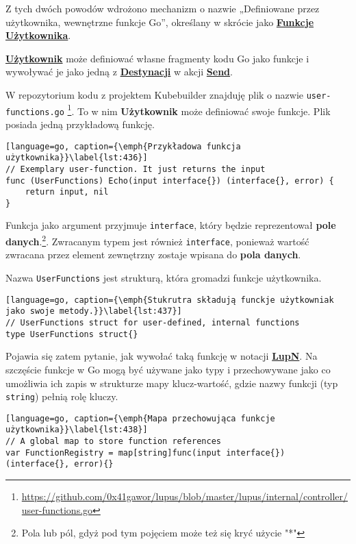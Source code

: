 Z tych dwóch powodów wdrożono mechanizm o nazwie „Definiowane przez użytkownika, wewnętrzne funkcje Go”, określany w skrócie jako \hyperlink{def:funkcje-uzytkownika}{\textbf{Funkcje Użytkownika}}.

\hyperlink{def:uzytkownik}{\textbf{Użytkownik}} może definiować własne fragmenty kodu Go jako funkcje i wywoływać je jako jedną z \hyperlink{def:destynacja}{\textbf{Destynacji}} w akcji \hyperlink{def:akcja}{\textbf{Send}}.

W repozytorium kodu z projektem Kubebuilder znajduję plik o nazwie \texttt{user-functions.go} \footnote{\url{https://github.com/0x41gawor/lupus/blob/master/lupus/internal/controller/user-functions.go}}. To w nim \textbf{Użytkownik} może definiować swoje funkcje. Plik posiada jedną przykładową funkcję.

\begin{lstlisting}[language=go, caption={\emph{Przykładowa funkcja użytkownika}}\label{lst:436}]
// Exemplary user-function. It just returns the input
func (UserFunctions) Echo(input interface{}) (interface{}, error) {
	return input, nil
}
\end{lstlisting}

Funkcja jako argument przyjmuje \texttt{interface{}}, który będzie reprezentował \textbf{pole danych}.\footnote{Pola lub pól, gdyż pod tym pojęciem może też się kryć użycie "*"}. Zwracanym typem jest również \texttt{interface{}}, ponieważ wartość zwracana przez element zewnętrzny zostaje wpisana do \textbf{pola danych}.

Nazwa \texttt{UserFunctions} jest strukturą, która gromadzi funkcje użytkownika.

\begin{lstlisting}[language=go, caption={\emph{Stukrutra składują funckje użytkowniak jako swoje metody.}}\label{lst:437}]
// UserFunctions struct for user-defined, internal functions
type UserFunctions struct{}
\end{lstlisting}

Pojawia się zatem pytanie, jak wywołać taką funkcję w notacji \hyperlink{def:lupn}{\textbf{LupN}}. Na szczęście funkcje w Go mogą być używane jako typy i przechowywane jako  co umożliwia ich zapis w strukturze mapy klucz-wartość, gdzie nazwy funkcji (typ \texttt{string}) pełnią rolę kluczy.


\begin{lstlisting}[language=go, caption={\emph{Mapa przechowująca funkcje użytkownika}}\label{lst:438}]
// A global map to store function references
var FunctionRegistry = map[string]func(input interface{}) (interface{}, error){}
\end{lstlisting}

